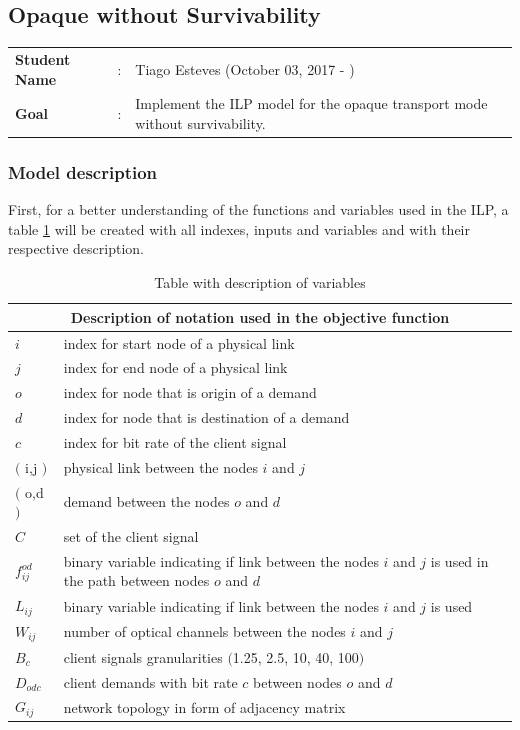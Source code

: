 \clearpage

\subsection{Opaque without Survivability}\label{ILP_Opaque_Survivability}
\begin{tcolorbox}	
\begin{tabular}{p{2.75cm} p{0.2cm} p{10.5cm}} 	
\textbf{Student Name}  &:& Tiago Esteves    (October 03, 2017 - )\\
\textbf{Goal}          &:& Implement the ILP model for the opaque transport mode without survivability.
\end{tabular}
\end{tcolorbox}

\subsubsection{Model description}

First, for a better understanding of the functions and variables used in the ILP, a table \ref{description_opaque} will be created with all indexes, inputs and variables and with their respective description.\\

\begin{table}[h!]
\centering
\begin{tabular}{ |p{1cm}||p{13cm}|}
 \hline
 \multicolumn{2}{|c|}{Description of notation used in the objective function} \\
 \hline
 \hline
 $i$ & index for start node of a physical link \\
 $j$ & index for end node of a physical link \\
 $o$ & index for node that is origin of a demand \\
 $d$ & index for node that is destination of a demand \\
 $c$ & index for bit rate of the client signal \\
 $($ i,j $)$ & physical link between the nodes $i$ and $j$ \\
 $($ o,d $)$ & demand between the nodes $o$ and $d$ \\
 $C$ & set of the client signal \\
 $f_{ij}^{od}$ & binary variable indicating if link between the nodes $i$ and $j$ is used in the path between nodes $o$ and $d$ \\
 $L_{ij}$ & binary variable indicating if link between the nodes $i$ and $j$ is used \\
 $W_{ij}$ & number of optical channels between the nodes $i$ and $j$\\
 $B_c $ & client signals granularities $($1.25, 2.5, 10, 40, 100$)$ \\
 $D_{odc}$ & client demands with bit rate $c$ between nodes $o$ and $d$ \\
 $G_{ij}$ & network topology in form of adjacency matrix \\
 \hline
\end{tabular}
\caption{Table with description of variables}
\label{description_opaque}
\end{table}

